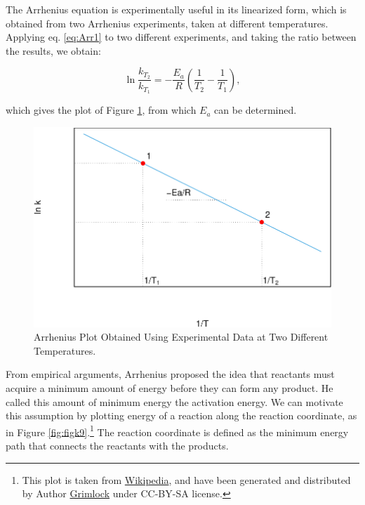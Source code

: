 \documentclass[
  9pt,
]{extbook}
\theoremstyle{definition}
\theoremstyle{definition}
\theoremstyle{definition}
\theoremstyle{remark}
\begin{document}
The Arrhenius equation is experimentally useful in its linearized form, which is obtained from two Arrhenius experiments, taken at different temperatures. Applying eq. \eqref{eq:Arr1} to two different experiments, and taking the ratio between the results, we obtain:

\begin{equation}
\ln \frac{k_{T_2}}{k_{T_1}}=-\frac{E_a}{R}\left(\frac{1}{T_2}-\frac{1}{T_1}\right),
\label{eq:Arr2}
\end{equation}

which gives the plot of Figure \ref{fig:figk8}, from which \(E_a\) can be determined.

\begin{figure}

{\centering \includegraphics{pchem1_files/figure-latex/figk8-1} 

}

\caption{Arrhenius Plot Obtained Using Experimental Data at Two Different Temperatures.}\label{fig:figk8}
\end{figure}

From empirical arguments, Arrhenius proposed the idea that reactants must acquire a minimum amount of energy before they can form any product. He called this amount of minimum energy the activation energy. We can motivate this assumption by plotting energy of a reaction along the reaction coordinate, as in Figure \ref{fig:figk9}.\footnote{This plot is taken from \href{https://en.wikipedia.org/wiki/Transition_state_theory}{Wikipedia}, and have been generated and distributed by Author \href{https://commons.wikimedia.org/wiki/User:Grimlock}{Grimlock} under CC-BY-SA license.} The reaction coordinate is defined as the minimum energy path that connects the reactants with the products.
\end{document}
